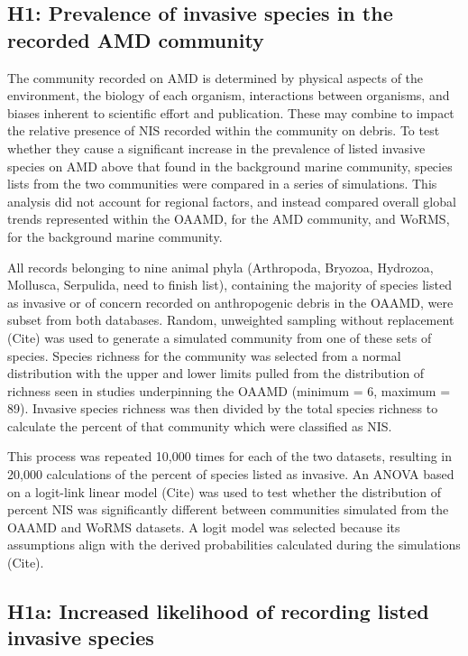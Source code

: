 \documentclass[a4paper, nobind]{templates/ociamthesis}
\begin{document}
\hypertarget{h1-prevalence-of-invasive-species-in-the-recorded-amd-community}{%
\subsection{H1: Prevalence of invasive species in the recorded AMD community}\label{h1-prevalence-of-invasive-species-in-the-recorded-amd-community}}

The community recorded on AMD is determined by physical aspects of the environment, the biology of each organism, interactions between organisms, and biases inherent to scientific effort and publication. These may combine to impact the relative presence of NIS recorded within the community on debris. To test whether they cause a significant increase in the prevalence of listed invasive species on AMD above that found in the background marine community, species lists from the two communities were compared in a series of simulations. This analysis did not account for regional factors, and instead compared overall global trends represented within the OAAMD, for the AMD community, and WoRMS, for the background marine community.

All records belonging to nine animal phyla (Arthropoda, Bryozoa, Hydrozoa, Mollusca, Serpulida, need to finish list), containing the majority of species listed as invasive or of concern recorded on anthropogenic debris in the OAAMD, were subset from both databases. Random, unweighted sampling without replacement (Cite) was used to generate a simulated community from one of these sets of species. Species richness for the community was selected from a normal distribution with the upper and lower limits pulled from the distribution of richness seen in studies underpinning the OAAMD (minimum = 6, maximum = 89). Invasive species richness was then divided by the total species richness to calculate the percent of that community which were classified as NIS.

This process was repeated 10,000 times for each of the two datasets, resulting in 20,000 calculations of the percent of species listed as invasive. An ANOVA based on a logit-link linear model (Cite) was used to test whether the distribution of percent NIS was significantly different between communities simulated from the OAAMD and WoRMS datasets. A logit model was selected because its assumptions align with the derived probabilities calculated during the simulations (Cite).

\hypertarget{h1a-increased-likelihood-of-recording-listed-invasive-species}{%
\subsection{H1a: Increased likelihood of recording listed invasive species}\label{h1a-increased-likelihood-of-recording-listed-invasive-species}}
\end{document}
